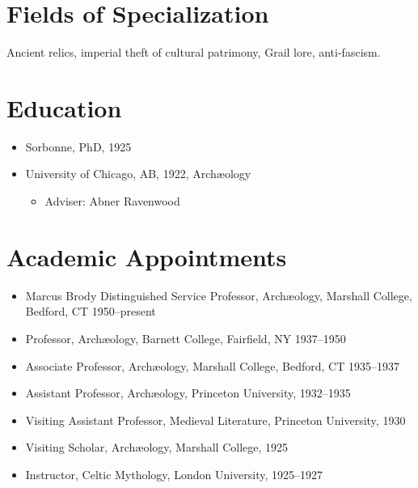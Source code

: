 \documentclass[margin,line]{res}
\date{2018-04-20}
\def\tightlist{} %
\renewcommand{\subsection}[1]{\section{#1}}
\begin{document}
  \begin{resume}
\hypertarget{fields-of-specialization}{%
\subsection{Fields of Specialization}\label{fields-of-specialization}}

Ancient relics, imperial theft of cultural patrimony, Grail lore,
anti-fascism.

\hypertarget{education}{%
\subsection{Education}\label{education}}

\begin{itemize}
\tightlist
\item
  Sorbonne, PhD, 1925
\item
  University of Chicago, AB, 1922, Archæology

  \begin{itemize}
  \tightlist
  \item
    Adviser: Abner Ravenwood
  \end{itemize}
\end{itemize}

\hypertarget{academic-appointments}{%
\subsection{Academic Appointments}\label{academic-appointments}}

\begin{itemize}
\tightlist
\item
  Marcus Brody Distinguished Service Professor, Archæology, Marshall
  College, Bedford, CT 1950--present
\item
  Professor, Archæology, Barnett College, Fairfield, NY 1937--1950
\item
  Associate Professor, Archæology, Marshall College, Bedford, CT
  1935--1937
\item
  Assistant Professor, Archæology, Princeton University, 1932--1935
\item
  Visiting Assistant Professor, Medieval Literature, Princeton
  University, 1930
\item
  Visiting Scholar, Archæology, Marshall College, 1925
\item
  Instructor, Celtic Mythology, London University, 1925--1927
\end{itemize}


\end{resume}
\end{document}
